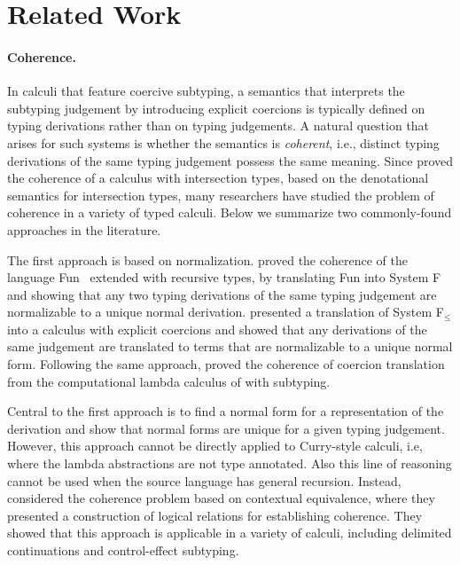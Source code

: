 
\section{Related Work}
\label{sec:related}

\paragraph{Coherence.}
In calculi that feature coercive subtyping, a semantics that interprets the
subtyping judgement by introducing explicit coercions is typically defined on
typing derivations rather than on typing judgements. A natural
question that arises
for such systems is whether the semantics is \textit{coherent}, i.e.,
distinct typing derivations of the same typing judgement possess the same
meaning. Since \citet{Reynolds_1991} proved the coherence of a calculus with
intersection types, based on the denotational semantics for intersection types,
many researchers have studied the problem of coherence in a variety of typed
calculi. Below we summarize two commonly-found approaches in the literature.

The first approach is based on normalization. \citet{Breazu_Tannen_1991} proved
the coherence of the language Fun~\citep{cardelli1985understanding} extended
with recursive types, by translating Fun into System F and showing that any two
typing derivations of the same typing judgement are normalizable to a unique
normal derivation. %
\citet{Curien_1992} presented a translation of System F$_\leq$ into a calculus
with explicit coercions and showed that any derivations of the same judgement are
translated to terms that are normalizable to a unique normal form. Following the
same approach, \citet{SCHWINGHAMMER_2008} proved the coherence of coercion
translation from the computational lambda calculus of \citet{Moggi_1991} with
subtyping.



Central to the first approach is to find a normal form for a representation of
the derivation and show that normal forms are unique for a given typing
judgement. However, this approach cannot be directly applied to Curry-style
calculi, i.e, where the lambda abstractions are not type annotated. Also this
line of reasoning cannot be used when the source language has general recursion.
Instead, \citet{biernacki2015logical} considered the coherence problem based on
contextual equivalence, where they presented a construction of logical relations
for establishing coherence. They showed that this approach is applicable in a
variety of calculi, including delimited continuations and control-effect
subtyping.


